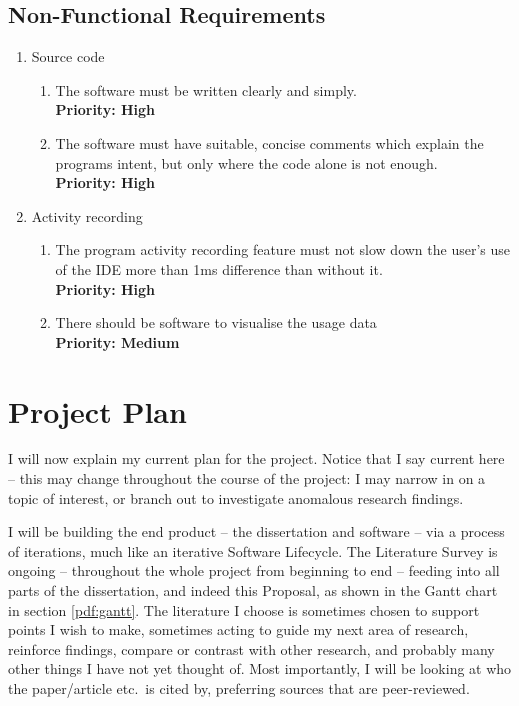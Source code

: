 \documentclass[11pt,openright,a4paper]{report}
\begin{document}
\section{Non-Functional Requirements}

\begin{enumerate}
  \item Source code
  \label{itm:source}
    \begin{enumerate}
      \item The software must be written clearly and simply.\\
        \textbf{Priority: High}
      \label{itm:source-clear}
      \item The software must have suitable, concise comments which explain the 
            programs intent, but only where the code alone is not enough.\\
        \textbf{Priority: High}
      \label{itm:source-comments}
    \end{enumerate}
  \item Activity recording
  \label{itm:results}
    \begin{enumerate}
      \item The program activity recording feature must not slow down 
	      the user's use of the IDE more than 1ms difference than without
	      it.\\
      \textbf{Priority: High}
      \label{itm:display-equivalent}
      \item There should be software to visualise the usage data\\
      \textbf{Priority: Medium}
      \label{itm:display-und5mins}
    \end{enumerate}
\end{enumerate}

\chapter{Project Plan}

I will now explain my current plan for the project. Notice that I say current
here -- this may change throughout the course of the project: I may narrow in on a
topic of interest, or branch out to investigate anomalous research findings. 

I will be building the end product -- the dissertation and software -- via a
process of iterations, much like an iterative Software Lifecycle. The Literature
Survey is ongoing -- throughout the whole project from beginning to end --
feeding into all parts of the dissertation, and indeed this Proposal, as shown
in the Gantt chart in section \ref{pdf:gantt}. The literature I choose is
sometimes chosen
to support points I wish to make, sometimes acting to guide my next area of research, reinforce findings,
compare or contrast with other research, and probably many other things I have not yet thought
of. Most importantly, I will be looking at who the
paper/article etc.\ is cited by, preferring sources that are peer-reviewed.
\end{document}

